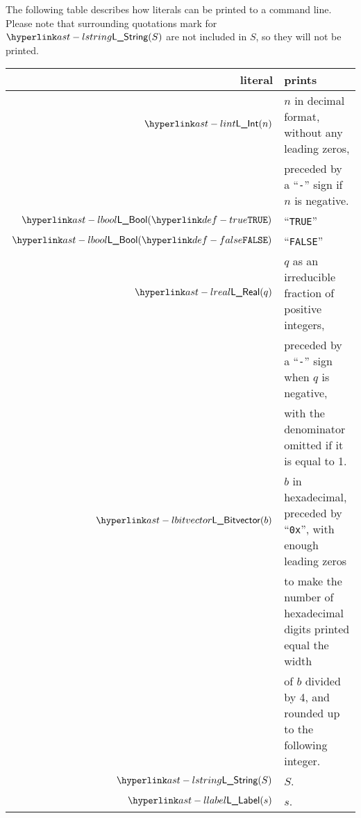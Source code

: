 The following table describes how literals can be printed to a command line.
%
Please note that surrounding quotations mark for $\lstring(S)$ are not included
in $S$, so they will not be printed.

\begin{tabular}{rl}
  \textbf{literal} & \textbf{prints} \\
  \hline
  $\lint(n)$ & $n$ in decimal format, without any leading zeros, \\
             & preceded by a ``\texttt{-}'' sign if $n$ is negative. \\
  $\lbool(\True)$ & ``\texttt{TRUE}'' \\
  $\lbool(\False)$ & ``\texttt{FALSE}'' \\
  $\lreal(q)$ & $q$ as an irreducible fraction of positive integers, \\
              & preceded by a ``\texttt{-}'' sign when $q$ is negative, \\
              & with the denominator omitted if it is equal to 1. \\
  $\lbitvector(b)$ & $b$ in hexadecimal, preceded by ``\texttt{0x}'', with enough leading zeros \\
                   & to make the number of hexadecimal digits printed equal the width \\
                   & of $b$ divided by 4, and rounded up to the following integer. \\
  $\lstring(S)$ & $S$. \\
  $\llabel(s)$ & $s$. \\
\end{tabular}
